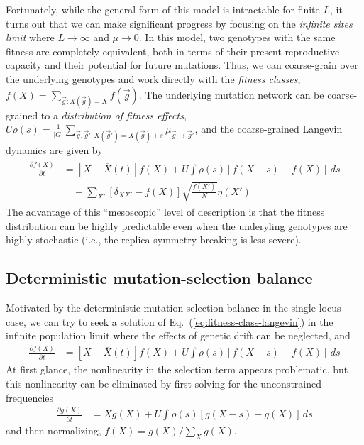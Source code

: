 \documentclass[11pt]{article}
\newcommand{\eq}[1]{Eq.~(\ref{#1})}
\begin{document}
Fortunately, while the general form of this model is intractable for finite $L$, it turns out that we can make significant progress by focusing on the \emph{infinite sites limit} where  $L \to \infty$ and $\mu \to 0$. In this model, two genotypes with the same fitness are completely equivalent, both in terms of their present reproductive capacity and their potential for future mutations. Thus, we can coarse-grain over the underlying genotypes and work directly with the \emph{fitness classes}, $f(X) = \sum_{\vec{g} : X(\vec{g}) = X} f(\vec{g})$. The underlying mutation network can be coarse-grained to a \emph{distribution of fitness effects}, $U \rho(s) = \frac{1}{|G|} \sum_{\vec{g},\vec{g}': X(\vec{g}') = X(\vec{g})+s} \mu_{\vec{g} \to \vec{g}'}$, and the coarse-grained Langevin dynamics are given by  
\begin{align}
\label{eq:fitness-class-langevin}
\begin{aligned}
\frac{\partial f(X)}{\partial t} & = \left[ X-\overline{X}(t) \right] f(X) + U \int \rho(s) \left[ f(X-s) - f(X) \right] \, ds \\
	& \quad + \sum_{X'} \left[ \delta_{XX'} - f(X) \right] \sqrt{\frac{f(X')}{N}} \eta(X')   
\end{aligned}
\end{align}
The advantage of this ``mesoscopic'' level of description is that the fitness distribution can be highly predictable even when the underyling genotypes are highly stochastic (i.e., the replica symmetry breaking is less severe). 

\subsection*{Deterministic mutation-selection balance}

Motivated by the deterministic mutation-selection balance in the single-locus case, we can try to seek a solution of \eq{eq:fitness-class-langevin} in the infinite population limit where the effects of genetic drift can be neglected, and 
\begin{align}
\label{eq:deterministic-fitness-distribution}
\frac{\partial f(X)}{\partial t} & = \left[ X-\overline{X}(t) \right] f(X) + U \int \rho(s) \left[ f(X-s) - f(X) \right] \, ds 
\end{align}
At first glance, the nonlinearity in the selection term appears problematic, but this nonlinearity can be eliminated by first solving for the unconstrained frequencies
\begin{align}
\label{eq:deterministic-fitness-distribution}
\frac{\partial g(X)}{\partial t} & = X g(X) + U \int \rho(s) \left[ g(X-s) - g(X) \right] \, ds 
\end{align}
and then normalizing, $f(X) = g(X) / \sum_X g(X)$. 
\end{document}
